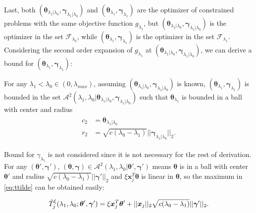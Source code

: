 Last, both $(\boldsymbol\theta_{\lambda_1|\lambda_0},\boldsymbol\gamma_{\lambda_1|\lambda_0})$ and $(\boldsymbol\theta_{\lambda_1},\boldsymbol\gamma_{\lambda_1})$ are the optimizer of constrained problems with the same objective function $g_{\lambda_1}$, but $(\boldsymbol\theta_{\lambda_1|\lambda_0},\boldsymbol\gamma_{\lambda_1|\lambda_0})$ is the optimizer in the set $\mathcal{F}_{\lambda_0}$, while $(\boldsymbol\theta_{\lambda_1},\boldsymbol\gamma_{\lambda_1})$ is the optimizer in the set $\mathcal{F}_{\lambda_1}$. Considering the second order expansion of $g_{\lambda_1}$ at $(\boldsymbol\theta_{\lambda_1|\lambda_0},\boldsymbol\gamma_{\lambda_1|\lambda_0})$, we can derive a bound for $(\boldsymbol\theta_{\lambda_1},\boldsymbol\gamma_{\lambda_1})$:

\begin{theorem}
    \label{thm:1.3.alt}
    For any $\lambda_1<\lambda_{0}\in (0,\lambda_{max})$, assuming $(\boldsymbol\theta_{\lambda_1|\lambda_0},\boldsymbol\gamma_{\lambda_1|\lambda_0})$ is known, $(\boldsymbol\theta_{\lambda_1},\boldsymbol\gamma_{\lambda_1})$ is bounded in the set $\mathcal{A}^2(\lambda_1,\lambda_0|\boldsymbol\theta_{\lambda_1|\lambda_0},\boldsymbol\gamma_{\lambda_1|\lambda_0})$ such that $\boldsymbol\theta_{\lambda_1}$ is bounded in a ball with center and radius
    \begin{gather}
        \begin{aligned}
            c_2&=\boldsymbol\theta_{\lambda_1|\lambda_0}\\
            r_2&=\sqrt{c(\lambda_0-\lambda_1)}||\boldsymbol\gamma_{\lambda_1|\lambda_0}||_2.
        \end{aligned}
    \end{gather}
\end{theorem}

Bound for $\gamma_{\lambda_1}$ is not considered since it is not necessary for the rest of derivation. For any $(\boldsymbol\theta',\boldsymbol\gamma')$, $(\boldsymbol\theta,\boldsymbol\gamma)\in\mathcal{A}^2(\lambda_1,\lambda_0|\boldsymbol\theta',\boldsymbol\gamma')$ means $\boldsymbol\theta$ is in a ball with center $\boldsymbol\theta'$ and radius $\sqrt{c(\lambda_0-\lambda_1)}||\boldsymbol\gamma'||_2$ and $\xi \boldsymbol x_j^T\boldsymbol\theta$ is linear in $\boldsymbol\theta$, so the maximum in \eqref{eq:ttilde} can be obtained easily:

\begin{equation}
    \label{eq:ttildexi.alt}
    \Tilde{T}^\xi_j(\lambda_1,\lambda_0;\boldsymbol\theta',\boldsymbol\gamma')=\xi \boldsymbol x_j^T\boldsymbol\theta'+||\boldsymbol x_j||_2\sqrt{c(\lambda_0-\lambda_1)}||\boldsymbol\gamma'||_2.
\end{equation}

